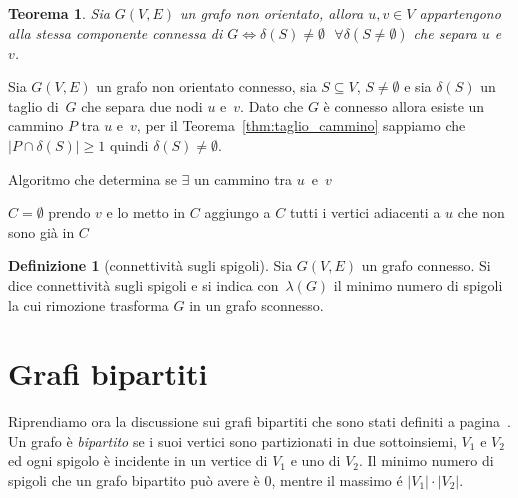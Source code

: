 \documentclass[a4paper, oneside, openany]{book}
\theoremstyle{plain}
\newtheorem{thm}{Teorema}[section]
\theoremstyle{definition}
\newtheorem{defn}{Definizione}[chapter]
\begin{document}
\begin{thm}
Sia $G(V,E)$ un grafo non orientato, allora ${u,v \in V}$ appartengono alla stessa 
componente connessa di ${G \iff \delta(S) \neq \emptyset \text{ } \forall 
\delta(S\neq \emptyset)}$ che separa $u$ e~$v$.
\end{thm}
\proof
Sia ${G(V,E)}$ un grafo non orientato connesso, sia ${S \subseteq V}$, ${S \neq \emptyset}$ e
sia $\delta(S)$ un taglio di~$G$ che separa due nodi $u$ e~$v$. Dato che $G$ è connesso allora
esiste un cammino $P$ tra $u$ e~$v$, per il Teorema~\ref{thm:taglio_cammino} sappiamo che
${ |P \cap \delta(S)| \geqslant 1 }$ quindi ${\delta(S) \neq \emptyset}$.
\endproof

\begin{algorithm}
\caption{Algoritmo che determina se $\exists$ un cammino tra $u$~e~$v$ }\label{alg:algo_bipartizione}
\begin{algorithmic}
\STATE $C = \emptyset$
\STATE prendo $v$ e lo metto in $C$ 
\STATE {}
    \STATE aggiungo a $C$ tutti i vertici adiacenti a $u$ che non sono già in $C$
\ENDFOR
\STATE {}

\end{algorithmic}
\end{algorithm}

\begin{defn}[connettività sugli spigoli]
Sia ${G(V,E)}$ un grafo connesso. Si dice connettività
sugli spigoli e si indica con~$\lambda(G)$ il minimo numero di spigoli la cui rimozione 
trasforma $G$ in un grafo sconnesso.
\end{defn}


\section{Grafi bipartiti}
Riprendiamo ora la discussione sui grafi bipartiti che sono stati definiti a pagina~\pageref{bip}.
Un grafo è \emph{bipartito} se i suoi vertici sono partizionati in due sottoinsiemi,
$V_1$ e $V_2$ ed ogni spigolo è incidente in un vertice di $V_1$ e uno di $V_2$.
Il minimo numero di spigoli che un grafo bipartito può avere è $0$, mentre il massimo é 
$|V_1|\cdot|V_2|$.
\end{document}
